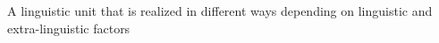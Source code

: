 A linguistic unit that is realized in different ways depending on linguistic and extra-linguistic factors

